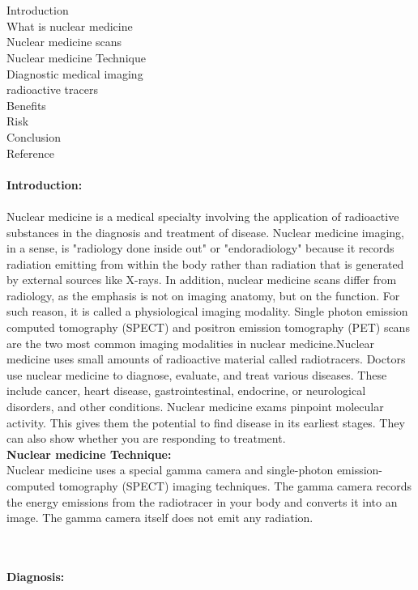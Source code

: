 \documentclass[12pt]{article}
\begin{document}
\\ \\Introduction \\ What is nuclear medicine \\ Nuclear medicine scans \\ Nuclear medicine Technique \\Diagnostic medical imaging \\ radioactive tracers \\  Benefits \\ Risk \\ Conclusion \\ Reference \\ \\ \textbf{\large Introduction:} \\ \\ Nuclear medicine is a medical specialty involving the application of radioactive substances in the diagnosis and treatment of disease. Nuclear medicine imaging, in a sense, is "radiology done inside out" or "endoradiology" because it records radiation emitting from within the body rather than radiation that is generated by external sources like X-rays. In addition, nuclear medicine scans differ from radiology, as the emphasis is not on imaging anatomy, but on the function. For such reason, it is called a physiological imaging modality. Single photon emission computed tomography (SPECT) and positron emission tomography (PET) scans are the two most common imaging modalities in nuclear medicine.Nuclear medicine uses small amounts of radioactive material called radiotracers. Doctors use nuclear medicine to diagnose, evaluate, and treat various diseases. These include cancer, heart disease, gastrointestinal, endocrine, or neurological disorders, and other conditions. Nuclear medicine exams pinpoint molecular activity. This gives them the potential to find disease in its earliest stages. They can also show whether you are responding to treatment.
\\

\noindent \textbf{\large Nuclear medicine Technique:} \\ Nuclear medicine uses a special gamma camera and single-photon emission-computed tomography (SPECT) imaging techniques. The gamma camera records the energy emissions from the radiotracer in your body and converts it into an image. The gamma camera itself does not emit any radiation. 

\\ \noindent
\\ \textbf{\large Diagnosis:}
\end{document}
